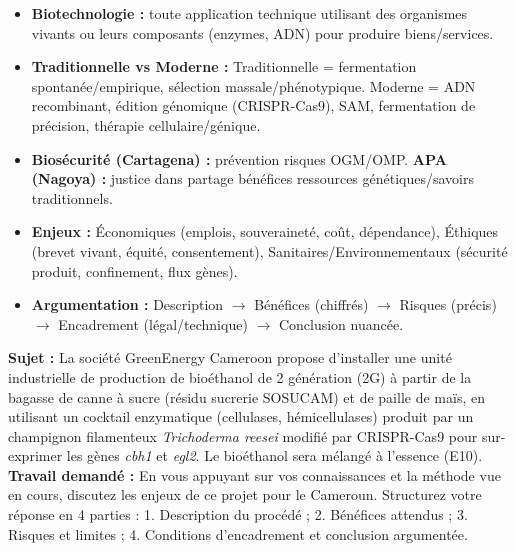 \documentclass[11pt]{article}
\begin{document}
\begin{aretenir}
\begin{itemize}
    \item \textbf{Biotechnologie :} toute application technique utilisant des organismes vivants ou leurs composants (enzymes, ADN) pour produire biens/services.
    \item \textbf{Traditionnelle vs Moderne :} Traditionnelle = fermentation spontanée/empirique, sélection massale/phénotypique. Moderne = ADN recombinant, édition génomique (CRISPR-Cas9), SAM, fermentation de précision, thérapie cellulaire/génique.
    \item \textbf{Biosécurité (Cartagena) :} prévention risques OGM/OMP. \textbf{APA (Nagoya) :} justice dans partage bénéfices ressources génétiques/savoirs traditionnels.
    \item \textbf{Enjeux :} Économiques (emplois, souveraineté, coût, dépendance), Éthiques (brevet vivant, équité, consentement), Sanitaires/Environnementaux (sécurité produit, confinement, flux gènes).
    \item \textbf{Argumentation :} Description $\rightarrow$ Bénéfices (chiffrés) $\rightarrow$ Risques (précis) $\rightarrow$ Encadrement (légal/technique) $\rightarrow$ Conclusion nuancée.
\end{itemize}
\end{aretenir}

\begin{exercice}
\textbf{Sujet :} La société \og GreenEnergy Cameroon \fg{} propose d'installer une unité industrielle de production de bioéthanol de 2 génération (2G) à partir de la bagasse de canne à sucre (résidu sucrerie SOSUCAM) et de paille de maïs, en utilisant un cocktail enzymatique (cellulases, hémicellulases) produit par un champignon filamenteux \emph{Trichoderma reesei} modifié par CRISPR-Cas9 pour sur-exprimer les gènes \emph{cbh1} et \emph{egl2}. Le bioéthanol sera mélangé à l'essence (E10).
\\
\textbf{Travail demandé :} En vous appuyant sur vos connaissances et la méthode vue en cours, discutez les enjeux de ce projet pour le Cameroun. Structurez votre réponse en 4 parties : 1. Description du procédé ; 2. Bénéfices attendus ; 3. Risques et limites ; 4. Conditions d'encadrement et conclusion argumentée.
\end{exercice}
\end{document}
